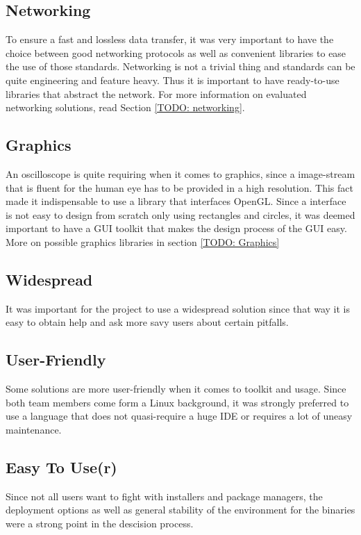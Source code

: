 \subsection*{Networking} To ensure a fast and lossless data transfer, it was very important to have the choice between good networking protocols as well as convenient libraries to ease the use of those standards.
Networking is not a trivial thing and standards can be quite engineering and feature heavy. Thus it is important to have ready-to-use libraries that abstract the network. For more information on evaluated networking solutions, read Section \ref{TODO: networking}.

\subsection*{Graphics} An oscilloscope is quite requiring when it comes to graphics, since a image-stream that is fluent for the human eye has to be provided in a high resolution. This fact made it indispensable to use a library that interfaces OpenGL. Since a interface is not easy to design from scratch only using rectangles and circles, it was deemed important to have a GUI toolkit that makes the design process of the GUI easy. More on possible graphics libraries in section \ref{TODO: Graphics}

\subsection*{Widespread} It was important for the project to use a widespread solution since that way it is easy to obtain help and ask more savy users about certain pitfalls.

\subsection*{User-Friendly} Some solutions are more user-friendly when it comes to toolkit and usage. Since both team members come form a Linux background, it was strongly preferred to use a language that does not quasi-require a huge IDE or requires a lot of uneasy maintenance.

\subsection*{Easy To Use(r)} Since not all users want to fight with installers and package managers, the deployment options as well as general stability of the environment for the binaries were a strong point in the descision process.

